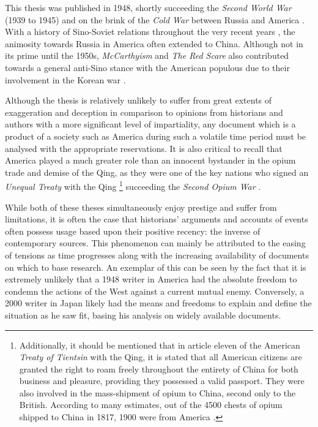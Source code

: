 \documentclass[a4paper,oneside]{article}
\begin{document}
This thesis was published in 1948, shortly succeeding the \textit{Second World
War} (1939 to 1945) and on the brink of the \textit{Cold War} between Russia and
America \autocite{Leffler:2010}. With a history of Sino-Soviet relations
throughout the very recent years \autocite{Garver:1989}, the animosity towards
Russia in America often extended to China. Although not in its prime until the
1950s, \textit{McCarthyism} and \textit{The Red Scare} also contributed towards
a general anti-Sino stance with the American populous due to their involvement
in the Korean war \autocite{Schrecker:1998}.

Although the thesis is relatively unlikely to suffer from great extents of
exaggeration and deception in comparison to opinions from historians and authors
with a more significant level of impartiality, any document which is a product
of a society such as America during such a volatile time period must be analysed
with the appropriate reservations. It is also critical to recall that America
played a much greater role than an innocent bystander in the opium trade and
demise of the Qing, as they were one of the key nations who signed an
\textit{Unequal Treaty} with the Qing
\autocite{Peters:1961}\footnote{Additionally, it should be mentioned that in
article eleven of the American \textit{Treaty of Tientsin} with the Qing, it is
stated that all American citizens are granted the right to roam freely
throughout the entirety of China for both business and pleasure, providing they
possessed a valid passport.  They were also involved in the mass-shipment of
opium to China, second only to the British. According to many estimates, out of
the 4500 chests of opium shipped to China in 1817, 1900 were from America
\autocite{Hu:1991}.} succeeding the \textit{Second Opium War}
\autocite{Johnstone:1937}.

While both of these theses simultaneously enjoy prestige and suffer from
limitations, it is often the case that historians' arguments and accounts of
events often possess usage based upon their positive recency: the inverse of
contemporary sources. This phenomenon can mainly be attributed to the easing of
tensions as time progresses along with the increasing availability of documents
on which to base research. An exemplar of this can be seen by the fact that it
is extremely unlikely that a 1948 writer in America had the absolute freedom to
condemn the actions of the West against a current mutual enemy. Conversely, a
2000 writer in Japan likely had the means and freedoms to explain and define the
situation as he saw fit, basing his analysis on widely available documents.
\end{document}
